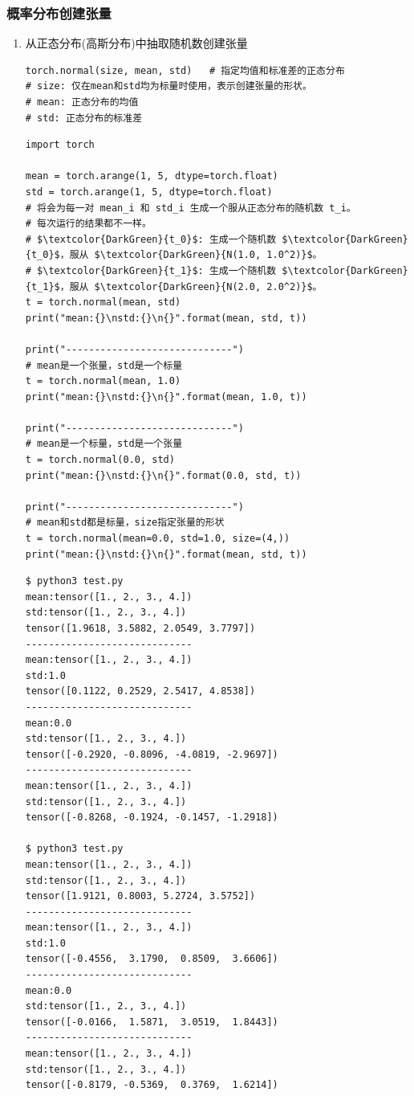 \subsubsection{概率分布创建张量}
\begin{enumerate}[label=\arabic*)]
\item 从正态分布(高斯分布)中抽取随机数创建张量
\begin{lstlisting}[style=demostyle,numbers=none]
torch.normal(size, mean, std)   # 指定均值和标准差的正态分布
# size: 仅在mean和std均为标量时使用，表示创建张量的形状。
# mean: 正态分布的均值
# std: 正态分布的标准差
\end{lstlisting}
\begin{lstlisting}[style=pythonstyle,mathescape=true]
import torch

mean = torch.arange(1, 5, dtype=torch.float)
std = torch.arange(1, 5, dtype=torch.float)
# 将会为每一对 mean_i 和 std_i 生成一个服从正态分布的随机数 t_i。
# 每次运行的结果都不一样。
# $\textcolor{DarkGreen}{t_0}$: 生成一个随机数 $\textcolor{DarkGreen}{t_0}$，服从 $\textcolor{DarkGreen}{N(1.0, 1.0^2)}$。
# $\textcolor{DarkGreen}{t_1}$: 生成一个随机数 $\textcolor{DarkGreen}{t_1}$，服从 $\textcolor{DarkGreen}{N(2.0, 2.0^2)}$。
t = torch.normal(mean, std)
print("mean:{}\nstd:{}\n{}".format(mean, std, t))

print("-----------------------------")
# mean是一个张量，std是一个标量
t = torch.normal(mean, 1.0)
print("mean:{}\nstd:{}\n{}".format(mean, 1.0, t))

print("-----------------------------")
# mean是一个标量，std是一个张量
t = torch.normal(0.0, std)
print("mean:{}\nstd:{}\n{}".format(0.0, std, t))

print("-----------------------------")
# mean和std都是标量，size指定张量的形状
t = torch.normal(mean=0.0, std=1.0, size=(4,))
print("mean:{}\nstd:{}\n{}".format(mean, std, t))
\end{lstlisting}
\begin{lstlisting}[style=demostyle,numbers=none]
$ python3 test.py
mean:tensor([1., 2., 3., 4.])
std:tensor([1., 2., 3., 4.])
tensor([1.9618, 3.5882, 2.0549, 3.7797])
-----------------------------
mean:tensor([1., 2., 3., 4.])
std:1.0
tensor([0.1122, 0.2529, 2.5417, 4.8538])
-----------------------------
mean:0.0
std:tensor([1., 2., 3., 4.])
tensor([-0.2920, -0.8096, -4.0819, -2.9697])
-----------------------------
mean:tensor([1., 2., 3., 4.])
std:tensor([1., 2., 3., 4.])
tensor([-0.8268, -0.1924, -0.1457, -1.2918])

$ python3 test.py        
mean:tensor([1., 2., 3., 4.])
std:tensor([1., 2., 3., 4.])
tensor([1.9121, 0.8003, 5.2724, 3.5752])
-----------------------------
mean:tensor([1., 2., 3., 4.])
std:1.0
tensor([-0.4556,  3.1790,  0.8509,  3.6606])
-----------------------------
mean:0.0
std:tensor([1., 2., 3., 4.])
tensor([-0.0166,  1.5871,  3.0519,  1.8443])
-----------------------------
mean:tensor([1., 2., 3., 4.])
std:tensor([1., 2., 3., 4.])
tensor([-0.8179, -0.5369,  0.3769,  1.6214])
\end{lstlisting}


\end{enumerate}
